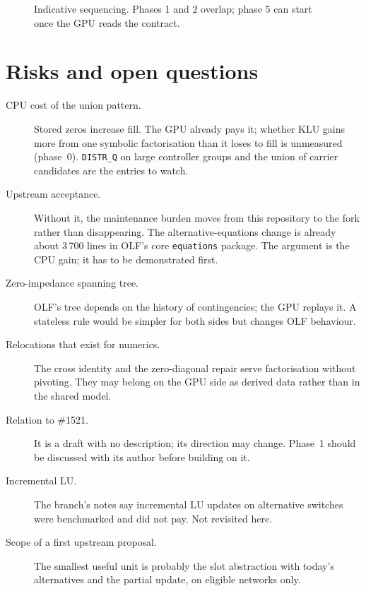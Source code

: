 \documentclass[11pt,a4paper]{article}
\newcommand{\code}[1]{\texttt{\small #1}}
\begin{document}
\begin{figure}[h]
\centering
{}
\caption{Indicative sequencing. Phases 1 and 2 overlap; phase 5 can start once the GPU
reads the contract.}
\end{figure}

\section{Risks and open questions}

\begin{description}
\item[CPU cost of the union pattern.] Stored zeros increase fill. The GPU already pays
      it; whether KLU gains more from one symbolic factorisation than it loses to fill is
      unmeasured (phase~0). \code{DISTR\_Q} on large controller groups and the union of
      carrier candidates are the entries to watch.
\item[Upstream acceptance.] Without it, the maintenance burden moves from this
      repository to the fork rather than disappearing. The alternative-equations change
      is already about 3\,700 lines in OLF's core \code{equations} package. The argument
      is the CPU gain; it has to be demonstrated first.
\item[Zero-impedance spanning tree.] OLF's tree depends on the history of contingencies;
      the GPU replays it. A stateless rule would be simpler for both sides but changes
      OLF behaviour.
\item[Relocations that exist for numerics.] The cross identity and the zero-diagonal
      repair serve factorisation without pivoting. They may belong on the GPU side as
      derived data rather than in the shared model.
\item[Relation to \#1521.] It is a draft with no description; its direction may change.
      Phase~1 should be discussed with its author before building on it.
\item[Incremental LU.] The branch's notes say incremental LU updates on alternative
      switches were benchmarked and did not pay. Not revisited here.
\item[Scope of a first upstream proposal.] The smallest useful unit is probably the slot
      abstraction with today's alternatives and the partial update, on eligible networks
      only.
\end{description}
\end{document}

